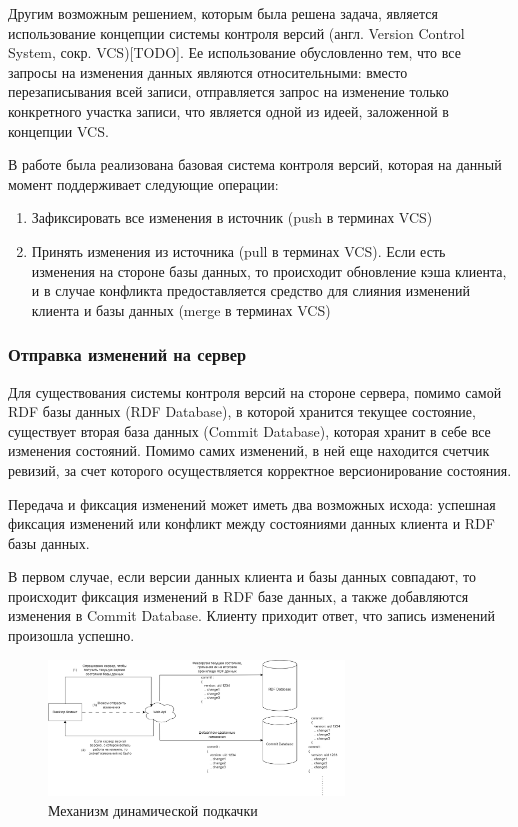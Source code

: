 \documentclass[12pt]{article}
\begin{document}
Другим возможным решением, которым была решена задача, является использование концепции системы контроля версий (англ. Version Control System, сокр. VCS)[TODO]. Ее использование обусловленно тем, что все запросы на изменения данных являются относительными: вместо перезаписывания всей записи, отправляется запрос на изменение только конкретного участка записи, что является одной из идеей, заложенной в концепции VCS.

В работе была реализована базовая система контроля версий, которая на данный момент поддерживает следующие операции:

\begin{enumerate}
    \item Зафиксировать все изменения в источник (push в терминах VCS)
    \item Принять изменения из источника (pull в терминах VCS). Если есть изменения на стороне базы данных, то происходит обновление кэша клиента, и в случае конфликта предоставляется средство для слияния изменений клиента и базы данных (merge в терминах VCS)
\end{enumerate}

\subsubsection{Отправка изменений на сервер}
\qquad Для существования системы контроля версий на стороне сервера, помимо самой RDF базы данных (RDF Database), в которой хранится текущее состояние, существует вторая база данных (Commit Database), которая хранит в себе все изменения состояний. Помимо самих изменений, в ней еще находится счетчик ревизий, за счет которого осуществляется корректное версионирование состояния.

Передача и фиксация изменений может иметь два возможных исхода: успешная фиксация изменений или конфликт между состояниями данных клиента и RDF базы данных.

В первом случае, если версии данных клиента и базы данных совпадают, то происходит фиксация изменений в RDF базе данных, а также добавляются изменения в Commit Database. Клиенту приходит ответ, что запись изменений произошла успешно.

\pagebreak

\begin{figure}[!ht]
    \centering
    \includegraphics[width=0.7\textwidth]{_images/if_merge_success.png}
    \caption{Механизм динамической подкачки}
    \label{fig:if_merge_success}
\end{figure}
\end{document}
